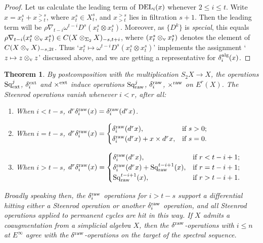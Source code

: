 \documentclass[11pt]{amsart}
\theoremstyle{plain}
\newtheorem{thm}{Theorem}[section]
\theoremstyle{definition}
\renewcommand{\to}{\longrightarrow}
\newcommand{\squishlist}{
  \setlength{\itemsep}{.5pt}
  \setlength{\parskip}{0pt}
  \setlength{\parsep}{0pt}}
\theoremstyle{plain}
\newcommand{\twist}{\omega}
\newcommand{\Nabla}{\nabla}
\newcommand{\Sq}{\mathrm{Sq}}
\begin{document}
\begin{second quadrant homotopy}
\begin{proof}
Let us calculate the leading term of $\textup{DEL}_{i}(x)$ whenever $2\leq i\leq t$. Write $x=x^s_t+x^{>s}_{>t}$, where $x^s_t\in X^s_t$, and $x^{>s}_{>t}$ lies in filtration $s+1$. Then the leading term will be $\rho\Nabla_{t-i}\twist^{t-i}D^s (x^s_t\otimes x^s_t)$. Moreover, as $\{D^k\}$ is \emph{special}, this equals $\rho{\Nabla}_{t-i}(x^s_t\otimes_\textup{v} x^s_t)\in C(X\otimes_{\Sigma_2} X)_{-s,t+i}$, where $(x^s_t\otimes_\textup{v} x^s_t)$ denotes the element of $C(X\otimes_\textup{v}X)_{-s,2t}$. Thus `$x^s_t\mapsto \twist^{t-i}D^s(x^s_t\otimes x^s_t)$' implements the assignment `$z\mapsto z\otimes_\textup{v} z$' discussed above, and we are getting a representative for $\delta^\textup{alg}_i(x)$.
\end{proof}




\begin{thm}
By postcomposition with the multiplication $S_2X\to X$, the operations $\Sq^j_\textup{ext}$, $\delta_i^\textup{ext}$ and $\times^\textup{ext}$ induce operations $\Sq^j_\textup{raw}$, $\delta_i^\textup{raw}$, $\times^\textup{raw}$ on $E^r(X)$. The Steenrod operations vanish whenever $i<r$, after all:
\begin{enumerate}\squishlist
\setlength{\parindent}{.25in}
\item When $i<t-s$, $d^r\delta^\textup{raw}_i(x)=\delta^\textup{raw}_i(d^rx)$.
\item When $i=t-s$, $d^r\delta^\textup{raw}_i(x)=\begin{cases}
\delta^\textup{raw}_i(d^rx),&\textup{if }s>0;\\
\delta^\textup{raw}_i(d^rx)+x\times d^rx,&\textup{if }s=0.
\end{cases}$
\item When $i>t-s$, $d^r\delta^\textup{raw}_i(x)=\begin{cases}
\delta^\textup{raw}_i(d^rx),&\textup{if }r<t-i+1;\\
\delta^\textup{raw}_i(d^rx)+\Sq_\textup{raw}^{t-i+1}(x),&\textup{if }r=t-i+1;\\
\Sq_\textup{raw}^{t-i+1}(x),&\textup{if }r>t-i+1.\\
\end{cases}$
\end{enumerate}
Broadly speaking then, the $\delta^\textup{raw}_i$ operations for $i>t-s$ support a differential hitting either a Steenrod operation or another $\delta^\textup{raw}_i$ operation, and all Steenrod operations applied to permanent cycles are hit in this way. If $X$ admits a coaugmentation from a simplicial algebra $X$, then the $\delta^\textup{raw}$-operations with $i\leq n$ at $E^\infty$ agree with the $\delta^\textup{raw}$-operations on the target of the spectral sequence.


\end{thm}
\end{second quadrant homotopy}
\end{document}

